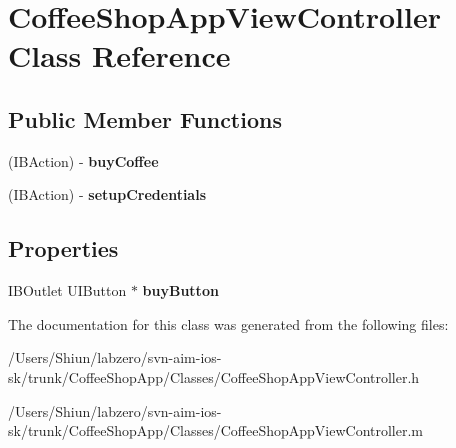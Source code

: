 \hypertarget{interface_coffee_shop_app_view_controller}{
\section{CoffeeShopAppViewController Class Reference}
\label{interface_coffee_shop_app_view_controller}
}
\subsection*{Public Member Functions}
\begin{DoxyCompactItemize}
\item 
\hypertarget{interface_coffee_shop_app_view_controller_aa5ac84d1a8bc198307bec592dcd2640d}{
(IBAction) -\/ {\bfseries buyCoffee}}
\label{interface_coffee_shop_app_view_controller_aa5ac84d1a8bc198307bec592dcd2640d}

\item 
\hypertarget{interface_coffee_shop_app_view_controller_a177add0bdb9267014f287caa2b2fa2b4}{
(IBAction) -\/ {\bfseries setupCredentials}}
\label{interface_coffee_shop_app_view_controller_a177add0bdb9267014f287caa2b2fa2b4}

\end{DoxyCompactItemize}
\subsection*{Properties}
\begin{DoxyCompactItemize}
\item 
\hypertarget{interface_coffee_shop_app_view_controller_a416328a88ec1b1025d7a8459a1121ad0}{
IBOutlet UIButton $\ast$ {\bfseries buyButton}}
\label{interface_coffee_shop_app_view_controller_a416328a88ec1b1025d7a8459a1121ad0}

\end{DoxyCompactItemize}


The documentation for this class was generated from the following files:\begin{DoxyCompactItemize}
\item 
/Users/Shiun/labzero/svn-\/aim-\/ios-\/sk/trunk/CoffeeShopApp/Classes/CoffeeShopAppViewController.h\item 
/Users/Shiun/labzero/svn-\/aim-\/ios-\/sk/trunk/CoffeeShopApp/Classes/CoffeeShopAppViewController.m\end{DoxyCompactItemize}
